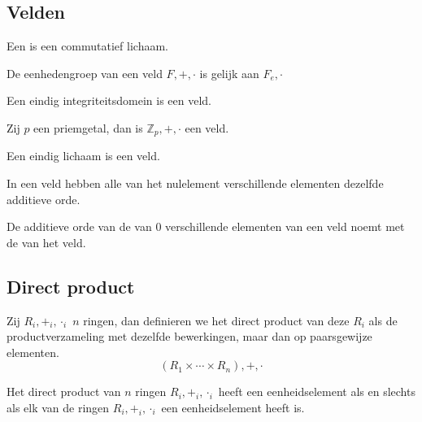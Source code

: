\documentclass[main.tex]{subfiles}
\begin{document}
\subsection{Velden}
\label{sec:velden}

\begin{de}
  Een  is een commutatief lichaam.
\end{de}

\begin{st}
  De eenhedengroep van een veld $F,+,\cdot$ is gelijk aan $F_{e},\cdot$
\end{st}

\begin{st}
  Een eindig integriteitsdomein is een veld.
\end{st}

\begin{gev}
  Zij $p$ een priemgetal, dan is $\mathbb{Z}_{p},+,\cdot$ een veld.
\end{gev}

\begin{st}
  Een eindig lichaam is een veld.
\end{st}

\begin{st}
  In een veld hebben alle van het nulelement verschillende elementen dezelfde additieve orde.
\end{st}

\begin{de}
  De additieve orde van de van $0$ verschillende elementen van een veld noemt met de  van het veld.
\end{de}


\subsection{Direct product}
\label{sec:direct-product}


\begin{de}
  Zij $R_{i},+_{i},\cdot_{i}$ $n$ ringen, dan definieren we het direct product van deze $R_{i}$ als de productverzameling met dezelfde bewerkingen, maar dan op paarsgewijze elementen.
  \[ (R_{1} \times \dotsb \times R_{n}),+,\cdot \]
\end{de}

\begin{st}
  Het direct product van $n$ ringen $R_{i},+_{i},\cdot_{i}$ heeft een eenheidselement als en slechts als elk van de ringen $R_{i},+_{i},\cdot_{i}$ een eenheidselement heeft is.
\end{st}
\end{document}
